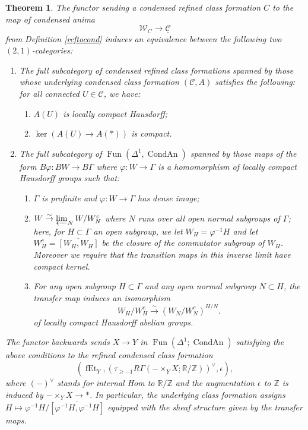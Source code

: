 \documentclass[12pt]{article}
\newtheorem{theorem}{Theorem}[section]
\theoremstyle{definition}
\newcommand{\on}{\operatorname}
\newcommand{\mc}{\mathcal}
\newcommand{\mbb}{\mathbb}
\newcommand{\ul}{\underline}
\begin{document}
\begin{theorem}
The functor sending a condensed refined class formation $C$ to the map of condensed anima
$$\mc{W}_C \to \ul{\mc{C}}$$
from Definition \ref{rcftocond} induces an equivalence between the following two $(2,1)$-categories:
\begin{enumerate}
\item The full subcategory of condensed refined class formations spanned by those whose underlying condensed class formation $(\mc{C},A)$ satisfies the following: for all connected $U\in\mc{C}$, we have:
\begin{enumerate}
\item $A(U)$ is locally compact Hausdorff;
\item $\on{ker}(A(U)\to A(\ast))$ is compact.
\end{enumerate}

\item The full subcategory of $\on{Fun}(\Delta^1,\on{CondAn})$ spanned by those maps of the form $B\varphi: BW\to B\Gamma$ where $\varphi:W\to \Gamma$ is a homomorphism of locally compact Hausdorff groups such that:
\begin{enumerate}
\item $\Gamma$ is profinite and $\varphi:W\to \Gamma$ has dense image;
\item $W\overset{\sim}{\rightarrow}\varprojlim_N W/W^c_N$ where $N$ runs over all open normal subgroups of $\Gamma$; here, for $H\subset \Gamma$ an open subgroup, we let $W_H = \varphi^{-1}H$ and let $W_H^c = \overline{[W_H,W_H]}$ be the closure of the commutator subgroup of $W_H$.  Moreover we require that the transition maps in this inverse limit have compact kernel.
\item For any open subgroup $H\subset \Gamma$ and any open normal subgroup $N\subset H$, the transfer map induces an isomorphism
$$W_H/W_H^c \overset{\sim}{\rightarrow} (W_N/W_N^c)^{H/N}.$$
of locally compact Hausdorff abelian groups.
\end{enumerate}
\end{enumerate}
The functor backwards sends $X\to Y$ in $\on{Fun}(\Delta^1;\on{CondAn})$ satisfying the above conditions to the refined condensed class formation
$$(\on{fEt}_Y,\left(\tau_{\geq -1}R\Gamma(-\times_YX;\mbb{R}/\mbb{Z})\right)^\vee,\epsilon),$$
where $(-)^\vee$ stands for internal Hom to $\mathbb{R}/\mbb{Z}$ and the augmentation $\epsilon$ to $\mbb{Z}$ is induced by $-\times_YX\to\ast$.  In particular, the underlying class formation assigns $H\mapsto \varphi^{-1}H/\overline{[\varphi^{-1}H,\varphi^{-1}H]}$ equipped with the sheaf structure given by the transfer maps.
\end{theorem}
\end{document}
